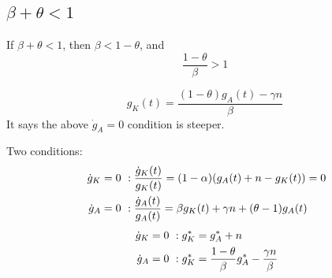\documentclass[12pt]{article}
\begin{document}
{\subsection{$ \beta + \theta < 1 $}
If $ \beta + \theta < 1 $, then $ \beta < 1 - \theta $, and 
\begin{equation*}
\frac{1 - \theta}{\beta} > 1
\end{equation*}


\begin{equation*}
g_{K}(t) = \frac{(1 - \theta)g_{A}(t) - \gamma n}{\beta}
\end{equation*}
It says the above $ \dot{g}_{A}=0 $ condition is steeper.

Two conditions:
\begin{align*}
\text{ $ \dot{g}_{K} =  0 $ }&:
\frac{\dot{g}_{K}(t)}{g_{K}(t)} = (1 - \alpha)(g_{A}(t) + n - g_{K}(t)) =0\\
\text{ $ \dot{g}_{A} = 0 $ }&:
\frac{\dot{g}_{A}(t)}{g_{A}(t)} = \beta g_{K}(t) + \gamma n  +  (\theta - 1) g_{A}(t)
\end{align*}
\begin{align}
		\label{eqn:gk = 0}
\text{ $ \dot{g}_{K} =  0 $ }&:
g_{K}^{*} = g_{A}^{*} + n\\
\label{eqn:ga = 0}
\text{ $ \dot{g}_{A} = 0 $ }&:
g_{K}^{*} = \frac{1 - \theta}{\beta}g_{A}^{*} - \frac{\gamma n}{\beta}
\end{align}


\begin{figure}[H]
\end{figure}

}
\end{document}
